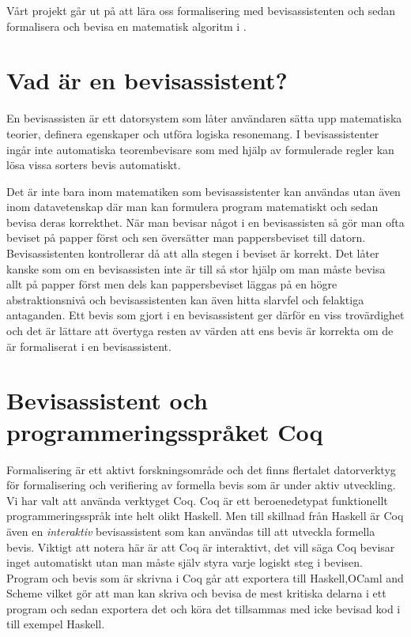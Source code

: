 Vårt projekt går ut på att lära oss formalisering med bevisassistenten \coq och
sedan formalisera och bevisa en matematisk algoritm i \coq.

\section{Vad är en bevisassistent?}
En bevisassisten är ett datorsystem som låter användaren
sätta upp matematiska teorier, definera egenskaper och utföra logiska
resonemang. I bevisassistenter ingår inte automatiska teorembevisare som
med hjälp av formulerade regler kan lösa vissa sorters bevis automatiskt.

Det är inte bara inom matematiken som bevisassistenter kan användas utan
även inom datavetenskap där man kan formulera program matematiskt och sedan
bevisa deras korrekthet. När man bevisar något i en bevisassisten så gör
man ofta beviset på papper först och sen översätter man pappersbeviset till
datorn. Bevisassistenten kontrollerar då att alla stegen i beviset är korrekt.
Det låter kanske som om en bevisassisten inte är till så stor hjälp om man
måste bevisa allt på papper först men dels kan pappersbeviset läggas på en
högre abstraktionsnivå och bevisassistenten kan även hitta slarvfel och
felaktiga antaganden. Ett bevis som gjort i en bevisassistent ger
därför en viss trovärdighet och det är lättare att övertyga resten av värden
att ens bevis är korrekta om de är formaliserat i en bevisassistent.

\section{Bevisassistent och programmeringsspråket Coq}
Formalisering är ett aktivt forskningsområde och det finns flertalet
datorverktyg för formalisering och verifiering av formella bevis som är under
aktiv utveckling. Vi har valt att använda verktyget Coq. Coq är ett
beroenedetypat funktionellt programmeringsspråk inte helt olikt Haskell. Men
till skillnad från Haskell är Coq även en \emph{interaktiv} bevisassistent som
kan användas till att utveckla formella bevis. Viktigt att notera här är att
Coq är interaktivt, det vill säga Coq bevisar inget automatiskt utan man måste
själv styra varje logiskt steg i bevisen. Program och bevis som är skrivna i
Coq går att exportera till Haskell,OCaml and Scheme vilket gör att man kan
skriva och bevisa de mest kritiska delarna i ett program och sedan exportera det
och köra det tillsammas med icke bevisad kod i till exempel Haskell.

